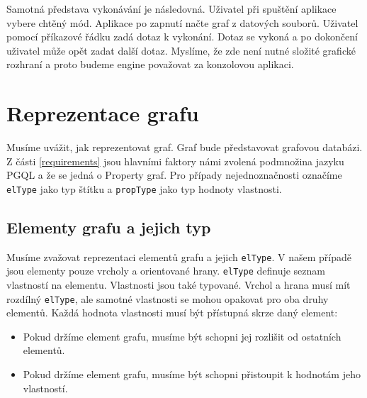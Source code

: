 Samotná představa vykonávání je následovná.
Uživatel při spuštění aplikace vybere chtěný mód.
Aplikace po zapnutí načte graf z datových souborů.
Uživatel pomocí příkazové řádku zadá dotaz k vykonání.
Dotaz se vykoná a po dokončení uživatel může opět zadat další dotaz.
Myslíme, že zde není nutné složité grafické rozhraní a proto budeme engine považovat za konzolovou aplikaci. 

\section{Reprezentace grafu} \label{anal.grafrep}

Musíme uvážit, jak reprezentovat graf.
Graf bude představovat grafovou databázi.
Z části \ref{requirements} jsou hlavními faktory námi zvolená podmnožina jazyku PGQL a že se jedná o Property graf.
Pro případy nejednoznačnosti označíme \verb+elType+ jako typ štítku a \verb+propType+ jako typ hodnoty vlastnosti.

\subsection{Elementy grafu a jejich typ}

Musíme zvažovat reprezentaci elementů grafu a jejich \verb+elType+.
V našem případě jsou elementy pouze vrcholy a orientované hrany.
\verb+elType+ definuje seznam vlastností na elementu. 
Vlastnosti jsou také typované.
Vrchol a hrana musí mít rozdílný \verb+elType+, ale samotné vlastnosti se mohou opakovat pro oba druhy elementů.
Každá hodnota vlastnosti musí být přístupná skrze daný element:

\begin{itemize}

\item Pokud držíme element grafu, musíme být schopni jej rozlišit od ostatních elementů.

\item Pokud držíme element grafu, musíme být schopni přistoupit k hodnotám jeho vlastností.

\end{itemize}

